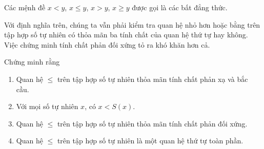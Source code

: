Các mệnh đề $x < y$, $x\leq y$, $x > y$, $x\geq y$ được gọi là các bất đẳng thức.

Với định nghĩa trên, chúng ta vẫn phải kiểm tra quan hệ nhỏ hơn hoặc bằng trên tập hợp số tự nhiên có thỏa mãn ba tính chất của quan hệ thứ tự hay không. Việc chứng minh tính chất phản đối xứng tỏ ra khó khăn hơn cả.

\begin{proposition}
    Chứng minh rằng
    \begin{enumerate}[label={(\roman*)}]
        \item Quan hệ $\leq$ trên tập hợp số tự nhiên thỏa mãn tính chất phản xạ và bắc cầu.
        \item Với mọi số tự nhiên $x$, có $x < S(x)$.
        \item Quan hệ $\leq$ trên tập hợp số tự nhiên thỏa mãn tính chất phản đối xứng.
        \item Quan hệ $\leq$ trên tập hợp số tự nhiên là một quan hệ thứ tự toàn phần.
    \end{enumerate}
\end{proposition}

